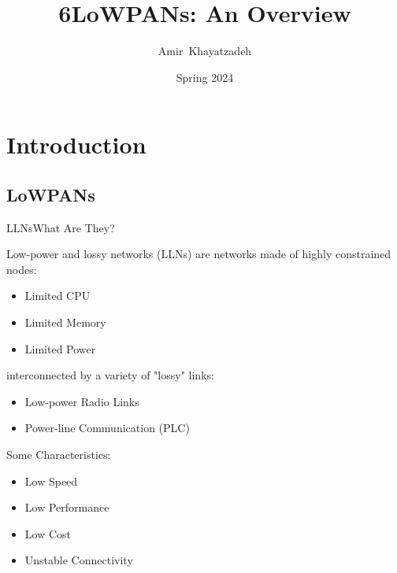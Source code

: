 \documentclass[10pt]{beamer}
\title{6LoWPANs: An Overview}
\author{Amir~Khayatzadeh}
\institute[IAUM]{Department of Computer Engineering\\ Islamic Azad University, Mashhad Branch}
\date{Spring 2024}
\begin{document}
\begin{frame}[plain]
    \titlepage
\end{frame}


\section{Introduction}
\subsection{LoWPANs}
\begin{frame}{LLNs\cite{rfc6568}}{What Are They?}

    Low-power and lossy networks (LLNs) are networks made of highly constrained nodes:
    \begin{itemize}
        \item Limited CPU
        \item Limited Memory
        \item Limited Power
    \end{itemize}
    interconnected by a variety of "lossy" links:
    \begin{itemize}
        \item Low-power Radio Links
        \item Power-line Communication (PLC)
    \end{itemize}
    Some Characteristics:
    \begin{itemize}
        \item Low Speed
        \item Low Performance
        \item Low Cost
        \item Unstable Connectivity
    \end{itemize}

\end{frame}
\end{document}
